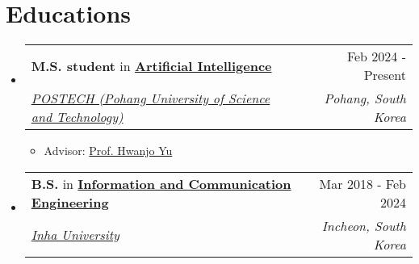 \documentclass[letterpaper,11pt]{article}
\makeatletter
\newcommand{\resumeSubheading}[4]{
  \vspace{-1pt}\item
    \begin{tabular*}{0.97\textwidth}{l@{\extracolsep{\fill}}r}
      #1 & #2 \\
      \textit{\small#3} & \textit{\small #4} \\
    \end{tabular*}\vspace{-5pt}
}
\makeatother
\begin{document}
    \section{Educations}
    \begin{itemize}[leftmargin=*,label=]
        \resumeSubheading
        {\textbf{M.S. student} in \textbf{\href{https://ai.postech.ac.kr/}{Artificial Intelligence}\textbf{}}}{Feb 2024 - Present}{\href{https://www.postech.ac.kr/eng/}{POSTECH (Pohang University of Science and Technology)}}{Pohang, South Korea}
            \begin{itemize}[label=\bullet]
                \item Advisor: \href{https://sites.google.com/view/postechdi/member/faculty?authuser=0}{Prof. Hwanjo Yu}
            \end{itemize}
            
        \resumeSubheading
        {\textbf{B.S.} in \textbf{\href{http://bit.ly/3Uu4LTi}{Information and Communication Engineering}}}{Mar 2018 - Feb 2024}{\href{https://eng.inha.ac.kr/eng/index.do}{Inha University}}{Incheon, South Korea}
            \begin{itemize}[label=\bullet]
            \end{itemize}

    \end{itemize}

    
\end{document}
